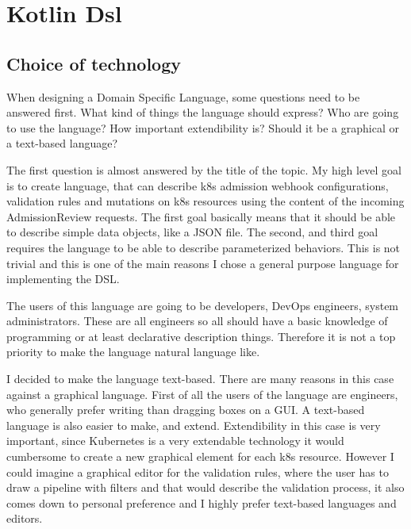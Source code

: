 \setlength{\parindent}{0pt}
\setlength{\parskip}{0.6em}

\chapter{Kotlin Dsl}
\label{sec:dsl}

\section{Choice of technology}

When designing a Domain Specific Language, some questions need to be answered first. What kind of things the language should express? Who are going to use the language? How important extendibility is? Should it be a graphical or a text-based language?

The first question is almost answered by the title of the topic. My high level goal is to create language, that can describe k8s admission webhook configurations, validation rules and mutations on k8s resources using the content of the incoming AdmissionReview requests. The first goal basically means that it should be able to describe simple data objects, like a JSON file. The second, and third goal requires the language to be able to describe parameterized behaviors. This is not trivial and this is one of the main reasons I chose a general purpose language for implementing the DSL.

The users of this language are going to be developers, DevOps engineers, system administrators. These are all engineers so all should have a basic knowledge of programming or at least declarative description things. Therefore it is not a top priority to make the language natural language like.

I decided to make the language text-based. There are many reasons in this case against a graphical language. First of all the users of the language are engineers, who generally prefer writing than dragging boxes on a GUI. A text-based language is also easier to make, and extend. Extendibility in this case is very important, since Kubernetes is a very extendable technology it would cumbersome to create a new graphical element for each k8s resource. However I could imagine a graphical editor for the validation rules, where the user has to draw a pipeline with filters and that would describe the validation process, it also comes down to personal preference and I highly prefer text-based languages and editors.

